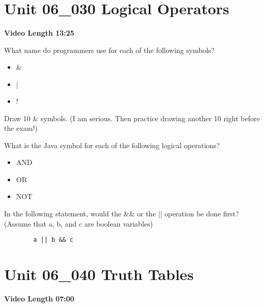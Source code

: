 \documentclass[letterpaper,12pt]{exam}
\newcommand{\unit}{Unit 06}
\begin{document}
\begin{questions}
\section*{\unit\_030 Logical Operators} %
\noindent \textbf{Video Length 13:25}

\begin{samepage}
    \question What name do programmers use for each of the following symbols?
      \begin{itemize}
        \item \&
        \vspace{5mm}
        \item $|$
        \vspace{5mm}
        \item !
        \vspace{5mm}
       \end{itemize}
\end{samepage}

\begin{samepage}
    \question Draw 10 \& symbols.  (I am serious.  Then practice drawing another 10 right before the exam!)
    \vspace{10mm}
\end{samepage}
\begin{samepage}
    \question What is the Java symbol for each of the following logical operations?
      \begin{itemize}
        \item AND
        \vspace{5mm}
        \item OR
        \vspace{5mm}
        \item NOT
        \vspace{5mm}
       \end{itemize}
\end{samepage}

\begin{samepage}
    \question In the following statement, would the && or the || operation be done first?  (Assume that a, b, and c are boolean variables)
    \begin{verbatim}
        a || b && c
    \end{verbatim}
    \vspace{5mm}
\end{samepage}
\section*{\unit\_040 Truth Tables} %
\noindent \textbf{Video Length 07:00}


\end{questions}
\end{document}
